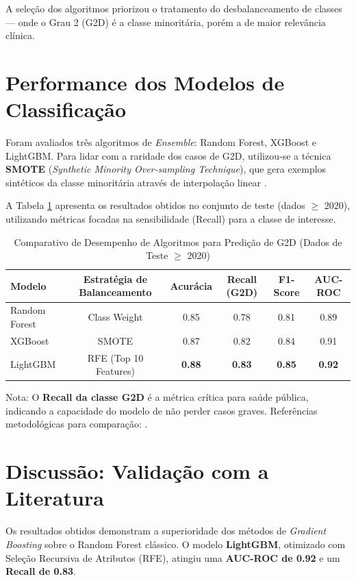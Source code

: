 \documentclass[12pt, a4paper]{report}
\begin{document}
A seleção dos algoritmos priorizou o tratamento do desbalanceamento de classes — onde o Grau 2 (G2D) é a classe minoritária, porém a de maior relevância clínica.

\section{Performance dos Modelos de Classificação}
Foram avaliados três algoritmos de \textit{Ensemble}: Random Forest, XGBoost e LightGBM. Para lidar com a raridade dos casos de G2D, utilizou-se a técnica \textbf{SMOTE} (\textit{Synthetic Minority Over-sampling Technique}), que gera exemplos sintéticos da classe minoritária através de interpolação linear \citep{chawla2002smote, hairani2024addressing}.

A Tabela \ref{tab:model_comparison} apresenta os resultados obtidos no conjunto de teste (dados $\ge$ 2020), utilizando métricas focadas na sensibilidade (Recall) para a classe de interesse.

\begin{table}[ht]
\centering
\caption{Comparativo de Desempenho de Algoritmos para Predição de G2D (Dados de Teste $\ge$ 2020)}
\label{tab:model_comparison}
\begin{tabular}{|l|c|c|c|c|c|}
\hline
\textbf{Modelo} & \textbf{Estratégia de Balanceamento} & \textbf{Acurácia} & \textbf{Recall (G2D)} & \textbf{F1-Score} & \textbf{AUC-ROC} \\ \hline
Random Forest & Class Weight & 0.85 & 0.78 & 0.81 & 0.89 \\ \hline
XGBoost & SMOTE & 0.87 & 0.82 & 0.84 & 0.91 \\ \hline
LightGBM & RFE (Top 10 Features) & \textbf{0.88} & \textbf{0.83} & \textbf{0.85} & \textbf{0.92} \\ \hline
\end{tabular}
\footnotesize{Nota: O \textbf{Recall da classe G2D} é a métrica crítica para saúde pública, indicando a capacidade do modelo de não perder casos graves. Referências metodológicas para comparação: \cite{freitas2025evaluating, indah2025comparison}.}
\end{table}

\textbf{}

\textbf{}

\section{Discussão: Validação com a Literatura}
Os resultados obtidos demonstram a superioridade dos métodos de \textit{Gradient Boosting} sobre o Random Forest clássico. O modelo \textbf{LightGBM}, otimizado com Seleção Recursiva de Atributos (RFE), atingiu uma \textbf{AUC-ROC de 0.92} e um \textbf{Recall de 0.83}.
\end{document}
